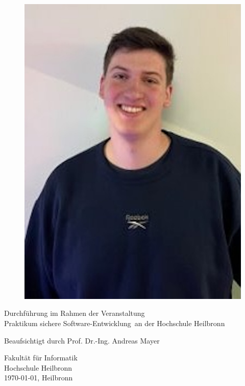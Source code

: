 \documentclass[10pt, a4paper,onecolumn ,titlepage]{article}
\begin{document}
\begin{titlepage}
\begin{center}
\begin{figure}[H]
\begin{minipage}[b]{.13\linewidth}
                    \includegraphics[width=\linewidth]{author_pictures/Fred}
                \end{minipage}\label{fig:frederik}
            \end{figure}


            \vfill

            Durchführung im Rahmen der Veranstaltung \\ \glqq Praktikum sichere Software-Entwicklung\grqq\ an der Hochschule Heilbronn

            \vspace{0.2cm}

            Beaufsichtigt durch Prof. Dr.-Ing. Andreas Mayer

            \vspace{1.0cm}


            \vspace{0.8cm}

            Fakultät für Informatik\\
            Hochschule Heilbronn\\
            \today{}, Heilbronn

        \end{center}

    \end{titlepage}
\end{document}
